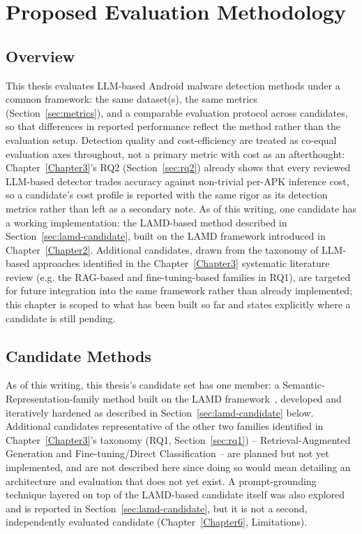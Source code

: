 \chapter{Proposed Evaluation Methodology}
\label{Chapter4}

\section{Overview}

This thesis evaluates LLM-based Android malware detection methods under a
common framework: the same dataset(s), the same metrics
(Section~\ref{sec:metrics}), and a comparable evaluation protocol across
candidates, so that differences in reported performance reflect the method
rather than the evaluation setup. Detection quality and cost-efficiency are
treated as co-equal evaluation axes throughout, not a primary metric with
cost as an afterthought: Chapter~\ref{Chapter3}'s RQ2
(Section~\ref{sec:rq2}) already shows that every reviewed LLM-based
detector trades accuracy against non-trivial per-APK inference cost, so a
candidate's cost profile is reported with the same rigor as its detection
metrics rather than left as a secondary note. As of this writing, one
candidate has a
working implementation: the LAMD-based method described in
Section~\ref{sec:lamd-candidate}, built on the LAMD framework introduced in
Chapter~\ref{Chapter2}. Additional candidates, drawn from the taxonomy of
LLM-based approaches identified in the Chapter~\ref{Chapter3} systematic
literature review (e.g. the RAG-based and fine-tuning-based families in
RQ1), are targeted for future integration into the same framework rather
than already implemented; this chapter is scoped to what has been built so
far and states explicitly where a candidate is still pending.

\section{Candidate Methods}

As of this writing, this thesis's candidate set has one member: a
Semantic-Representation-family method built on the LAMD
framework~\cite{Qian2025-ua}, developed and iteratively hardened as
described in Section~\ref{sec:lamd-candidate} below. Additional candidates
representative of the other two families identified in
Chapter~\ref{Chapter3}'s taxonomy (RQ1, Section~\ref{sec:rq1}) --
Retrieval-Augmented Generation and Fine-tuning/Direct Classification --
are planned but not yet implemented, and are not described here since
doing so would mean detailing an architecture and evaluation that does
not yet exist. A prompt-grounding technique layered on top of the
LAMD-based candidate itself was also explored and is reported in
Section~\ref{sec:lamd-candidate}, but it is not a second, independently
evaluated candidate (Chapter~\ref{Chapter6}, Limitations).

